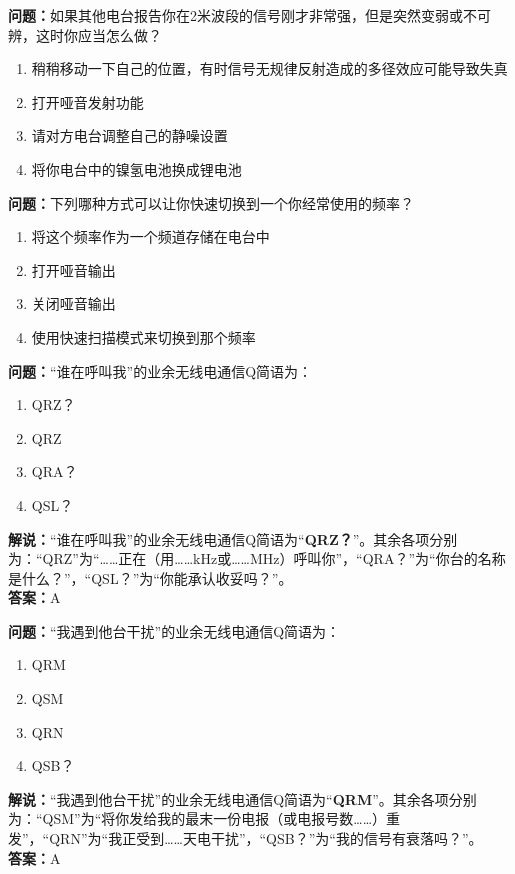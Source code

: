 \textbf{问题：}如果其他电台报告你在2米波段的信号刚才非常强，但是突然变弱或不可辨，这时你应当怎么做？
\begin{enumerate}[label=\Alph*), leftmargin=1cm]
	\item 稍稍移动一下自己的位置，有时信号无规律反射造成的多径效应可能导致失真
	\item 打开哑音发射功能
	\item 请对方电台调整自己的静噪设置
	\item 将你电台中的镍氢电池换成锂电池
\end{enumerate}

\textbf{问题：}下列哪种方式可以让你快速切换到一个你经常使用的频率？
\begin{enumerate}[label=\Alph*), leftmargin=1cm]
	\item 将这个频率作为一个频道存储在电台中
	\item 打开哑音输出
	\item 关闭哑音输出
	\item 使用快速扫描模式来切换到那个频率
\end{enumerate}

\textbf{问题：}“谁在呼叫我”的业余无线电通信Q简语为：

\begin{enumerate}[label=\Alph*), leftmargin=1cm]
	\item QRZ？
	\item QRZ
	\item QRA？
	\item QSL？
\end{enumerate}

\textbf{解说：}“谁在呼叫我”的业余无线电通信Q简语为“\textbf{QRZ？}”。其余各项分别为：“QRZ”为“……正在（用……kHz或……MHz）呼叫你”，“QRA？”为“你台的名称是什么？”，“QSL？”为“你能承认收妥吗？”。\\\textbf{答案：}A



\textbf{问题：}“我遇到他台干扰”的业余无线电通信Q简语为：

\begin{enumerate}[label=\Alph*), leftmargin=1cm]
	\item QRM
	\item QSM
	\item QRN
	\item QSB？
\end{enumerate}

\textbf{解说：}“我遇到他台干扰”的业余无线电通信Q简语为“\textbf{QRM}”。其余各项分别为：“QSM”为“将你发给我的最末一份电报（或电报号数……）重发”，“QRN”为“我正受到……天电干扰”，“QSB？”为“我的信号有衰落吗？”。\\\textbf{答案：}A




